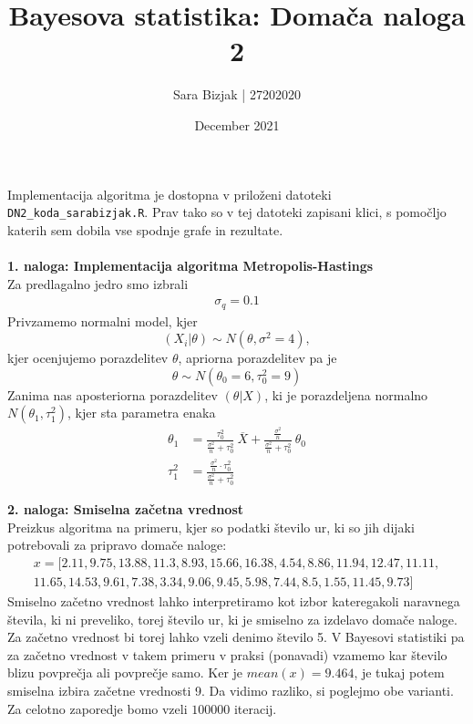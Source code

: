 \documentclass[a4paper,11pt]{article}
\title{Bayesova statistika: Domača naloga 2 }
\author{Sara Bizjak  |  27202020}
\date{December 2021}
\begin{document}
\maketitle
\noindent
Implementacija algoritma je dostopna v priloženi datoteki \texttt{DN2\_koda\_sarabizjak.R}. Prav tako so v tej datoteki zapisani klici, s pomočljo katerih sem dobila vse spodnje grafe in rezultate.
\\
\\
\noindent
\textbf{1. naloga: Implementacija algoritma Metropolis-Hastings}
\\
Za predlagalno jedro smo izbrali 
\begin{align*}\label{predlagalno_jedro}
    \sigma_q = 0.1
\end{align*}
Privzamemo normalni model, kjer 
$$(X_i | \theta) \sim N( \theta, \sigma^2 = 4),$$
kjer ocenjujemo porazdelitev $\theta$, 
apriorna porazdelitev pa je 
$$\theta \sim N(\theta_0 = 6, \tau_0^2 = 9)$$
Zanima nas aposteriorna porazdelitev $(\theta | X)$, ki je porazdeljena normalno $N( \theta_1, \tau_1^2)$, kjer sta parametra enaka
\begin{align*} 
    \theta_1 &= \frac{\tau_0^2}{\frac{\sigma^2}{n} + \tau_0^2} \ \overline{X} + \frac{\frac{\sigma^2}{n}}{\frac{\sigma^2}{n} + \tau_0^2} \ \theta_0
    \\
    \tau_1^2 &= \frac{\frac{\sigma^2}{n} \cdot \tau_0^2}{\frac{\sigma^2}{n} + \tau_0^2}
\end{align*}

\noindent
\textbf{2. naloga: Smiselna začetna vrednost}
\\
Preizkus algoritma na primeru, kjer so podatki število ur, ki so jih dijaki potrebovali za pripravo domače naloge:
\begin{align*} 
    x = [2.11, 9.75, 13.88, 11.3, 8.93, 15.66, 16.38, 4.54, 8.86, 11.94, 12.47, 11.11, 
    \\
    11.65, 14.53, 9.61, 7.38, 3.34, 9.06, 9.45, 5.98, 7.44, 8.5, 1.55, 11.45, 9.73]
\end{align*}
Smiselno začetno vrednost lahko interpretiramo kot izbor kateregakoli naravnega števila, ki ni preveliko, torej število ur, ki je smiselno za izdelavo domače naloge.
Za začetno vrednost bi torej lahko vzeli denimo število 5. V Bayesovi statistiki pa za začetno vrednost v takem primeru v praksi (ponavadi) vzamemo kar število blizu povprečja ali povprečje samo. 
Ker je $mean(x) = 9.464$, je tukaj potem smiselna izbira začetne vrednosti 9. Da vidimo razliko, si poglejmo obe varianti.
Za celotno zaporedje bomo vzeli $100000$ iteracij.
\end{document}
